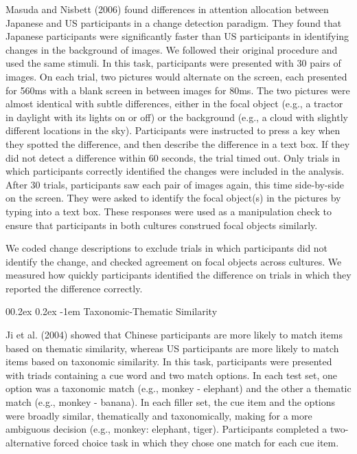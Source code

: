 \documentclass[
  man,floatsintext]{apa6}
\makeatletter
\let\oldparagraph\paragraph
\renewcommand{\paragraph}[1]{\oldparagraph{#1}\mbox{}}
\renewcommand{\paragraph}{\@startsection{paragraph}{4}{\parindent}%
  {0\baselineskip \@plus 0.2ex \@minus 0.2ex}%
  {-1em}%
  {\normalfont\normalsize\bfseries\itshape\typesectitle}}
\makeatother
\begin{document}
Masuda and Nisbett (2006) found differences in attention allocation between Japanese and US participants in a change detection paradigm. They found that Japanese participants were significantly faster than US participants in identifying changes in the background of images. We followed their original procedure and used the same stimuli. In this task, participants were presented with 30 pairs of images. On each trial, two pictures would alternate on the screen, each presented for 560ms with a blank screen in between images for 80ms. The two pictures were almost identical with subtle differences, either in the focal object (e.g., a tractor in daylight with its lights on or off) or the background (e.g., a cloud with slightly different locations in the sky). Participants were instructed to press a key when they spotted the difference, and then describe the difference in a text box. If they did not detect a difference within 60 seconds, the trial timed out. Only trials in which participants correctly identified the changes were included in the analysis. After 30 trials, participants saw each pair of images again, this time side-by-side on the screen. They were asked to identify the focal object(s) in the pictures by typing into a text box. These responses were used as a manipulation check to ensure that participants in both cultures construed focal objects similarly.

We coded change descriptions to exclude trials in which participants did not identify the change, and checked agreement on focal objects across cultures. We measured how quickly participants identified the difference on trials in which they reported the difference correctly.

\hypertarget{taxonomic-thematic-similarity}{%
\paragraph{Taxonomic-Thematic Similarity}\label{taxonomic-thematic-similarity}}

Ji et al. (2004) showed that Chinese participants are more likely to match items based on thematic similarity, whereas US participants are more likely to match items based on taxonomic similarity. In this task, participants were presented with triads containing a cue word and two match options. In each test set, one option was a taxonomic match (e.g., monkey - elephant) and the other a thematic match (e.g., monkey - banana). In each filler set, the cue item and the options were broadly similar, thematically and taxonomically, making for a more ambiguous decision (e.g., monkey: elephant, tiger). Participants completed a two-alternative forced choice task in which they chose one match for each cue item.
\end{document}
